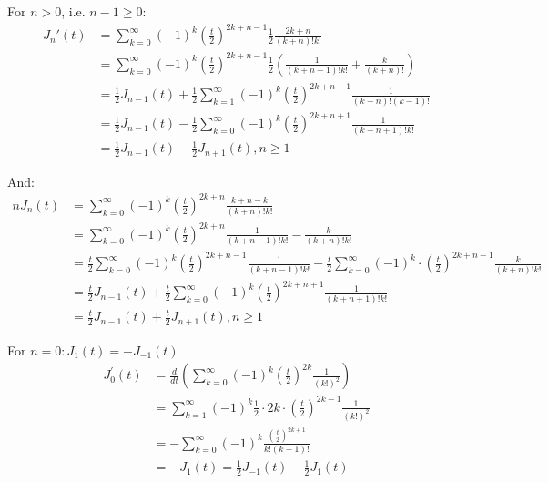 \documentclass[]{ctexart}
\begin{document}
	For $n>0$, i.e. $n-1\geq0$:
		\begin{equation*}
		\begin{aligned}
			J_n'(t)&=\sum_{k=0}^{\infty}(-1)^{k}\left(\frac{t}{2}\right)^{2k+n-1}\frac{1}{2}\frac{2k+n}{(k+n)!k!}\\
			&=\sum_{k=0}^{\infty}(-1)^{k}\left(\frac{t}{2}\right)^{2k+n-1}\frac{1}{2}\left(\frac{1}{(k+n-1)!k!}+\frac{k}{(k+n)!}\right)\\
			&=\frac{1}{2} J_{n-1}(t)+\frac{1}{2} \sum_{k=1}^{\infty}(-1)^{k}\left(\frac{t}{2}\right)^{2 k+n-1} \frac{1}{(k+n) !(k-1) !}  \\
			&=\frac{1}{2} J_{n-1}(t)-\frac{1}{2} \sum_{k=0}^{\infty}(-1)^{k}\left(\frac{t}{2}\right)^{2 k+n+1} \frac{1}{(k+n+1) ! k !} \\
			&=\frac{1}{2} J_{n-1}(t)-\frac{1}{2} J_{n+1}(t), n \geqslant 1
		\end{aligned}
		\end{equation*}
	
	And: 
		\begin{equation*}
		\begin{aligned}
			n J_{n}(t) &=\sum_{k=0}^{\infty}(-1)^{k}\left(\frac{t}{2}\right)^{2 k+n} \frac{k+n-k}{(k+n) ! k !}\\
			&=\sum_{k=0}^{\infty}(-1)^{k}\left(\frac{t}{2}\right)^{2 k+n}\frac{1}{(k+n-1) ! k !}-\frac{k}{(k+n) ! k !} \\
			&=\frac{t}{2} \sum_{k=0}^{\infty}(-1)^{k}\left(\frac{t}{2}\right)^{2 k+n-1} \frac{1}{(k+n-1) ! k !}-\frac{t}{2} \sum_{k=0}^{\infty}(-1)^{k} \cdot\left(\frac{t}{2}\right)^{2 k+n-1} \frac{k}{(k+n) ! k !} \\
			&=\frac{t}{2} J_{n-1}(t)+\frac{t}{2} \sum_{k=0}^{\infty}(-1)^{k}\left(\frac{t}{2}\right)^{2 k+n+1} \frac{1}{(k+n+1) ! k !} \\
			&=\frac{t}{2} J_{n-1}(t)+\frac{t}{2} J_{n+1}(t), n \geqslant 1
		\end{aligned}
		\end{equation*}
	
	For $n=0:J_1(t)=-J_{-1}(t)$
		\begin{equation*}
		\begin{aligned}
			J_{0}^{\prime}(t) &=\frac{d}{d t}\left(\sum_{k=0}^{\infty}(-1)^{k}\left(\frac{t}{2}\right)^{2 k} \frac{1}{(k !)^{2}}\right)\\
			&=\sum_{k=1}^{\infty}(-1)^{k} \frac{1}{2} \cdot 2 k \cdot\left(\frac{t}{2}\right)^{2 k-1} \frac{1}{(k !)^{2}} \\
			&=-\sum_{k=0}^{\infty}(-1)^{k} \frac{\left(\frac{t}{2}\right)^{2 k+1}}{k !(k+1) !} \quad\\
			&=-J_{1}(t)=\frac{1}{2} J_{-1}(t)-\frac{1}{2} J_{1}(t)
		\end{aligned}
		\end{equation*}
		
\end{document}
